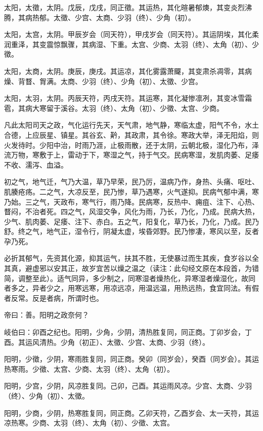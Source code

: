 \documentclass{article}%
\begin{document}
太阳，太徵，太阴。戊辰，戊戌，同正徵。其运热，其化暄暑郁燠，其变炎烈沸腾，其病热郁。太徵、少宫、太商、少羽（终）、少角（初）。

太阳，太宫，太阴。甲辰岁会（同天符），甲戌岁会（同天符）。其运阴埃，其化柔润重泽，其变震惊飘骤，其病湿、下重。太宫、少商、太羽（终）、太角（初）、少徵。

太阳，太商，太阴。庚辰，庚戌。其运凉，其化雾露萧飋，其变肃杀凋零，其病燥、背瞀、胷满。太商、少羽（终）、少角（初）、太徵、少宫。

太阳，太羽，太阴。丙辰天符，丙戌天符。其运寒，其化凝惨凛冽，其变冰雪霜雹，其病大寒留于溪谷。太羽（终）、太角（初）、少徵、太宫、少商。

凡此太阳司天之政，气化运行先天，天气肃，地气静，寒临太虚，阳气不令，水土合德，上应辰星、镇星。其谷玄、黅，其政肃，其令徐。寒政大举，泽无阳焰，则火发待时。少阳中治，时雨乃涯，止极雨散，还于太阴，云朝北极，湿化乃布，泽流万物，寒敷于上，雷动于下，寒湿之气，持于气交。民病寒湿，发肌肉萎、足痿不收、濡泻、血溢。

初之气，地气迁，气乃大温，草乃早荣，民乃厉，温病乃作，身热、头痛、呕吐、肌腠疮疡。二之气，大凉反至，民乃惨，草乃遇寒，火气遂抑。民病气郁中满，寒乃始。三之气，天政布，寒气行，雨乃降。民病寒，反热中、痈疽、注下、心热、瞀闷，不治者死。四之气，风湿交争，风化为雨，乃长，乃化，乃成。民病大热，少气、肌肉萎、足痿、注下、赤白。五之气，阳复化，草乃长，乃化，乃成。民乃舒。终之气，地气正，湿令行，阴凝太虚，埃昏郊野。民乃惨凄，寒风以至，反者孕乃死。

必折其郁气，先资其化源，抑其运气，扶其不胜，无使暴过而生其疾，食岁谷以全其真，避虚邪以安其正，故岁宜苦以燥之温之（读注：此句经文原在本段首，为错简，调整至此）。适气同异，多少制之，同寒湿者燥热化，异寒湿者燥湿化，故同者多之，异者少之，用寒远寒，用凉远凉，用温远温，用热远热，食宜同法。有假者反常。反是者病，所谓时也。

帝曰：善。阳明之政奈何？

岐伯曰：卯酉之纪也。阳明，少角，少阴，清热胜复同，同正商。丁卯岁会，丁酉。其运风清热。少角（初正）、太徵、少宫、太商、少羽（终）。

阳明，少徵，少阴，寒雨胜复同，同正商。癸卯（同岁会），癸酉（同岁会）。其运热寒雨。少徵、太宫、少商、太羽（终）、太角（初）。

阳明，少宫，少阴，风凉胜复同。己卯，己酉。其运雨风凉。少宫、太商、少羽（终）、少角（初）、太徵。

阳明，少商，少阴，热寒胜复同，同正商。乙卯天符，乙酉岁会、太一天符，其运凉热寒。少商、太羽（终）、太角（初）、少徵、太宫。
\end{document}
